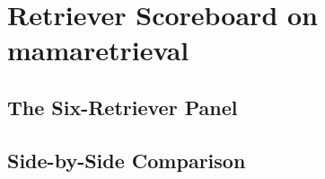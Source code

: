 \section{Retriever Scoreboard on mamaretrieval}


\subsection{The Six-Retriever Panel}

\subsection{Side-by-Side Comparison}
